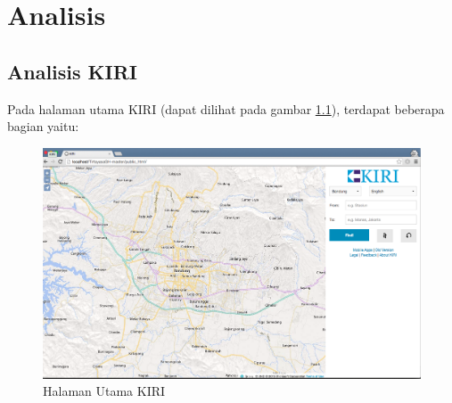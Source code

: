 \chapter{Analisis}
\label{chap:analisis}

\section{Analisis KIRI}
\label{sec:analisiskiri}
Pada halaman utama KIRI (dapat dilihat pada gambar \ref{fig:3_KIRI_main}), terdapat beberapa bagian yaitu:

\begin{figure}[H]
	\centering
	\includegraphics[scale=0.3]{Gambar/KIRI-main}
	\caption{Halaman Utama KIRI} 
	\label{fig:3_KIRI_main}
\end{figure}

